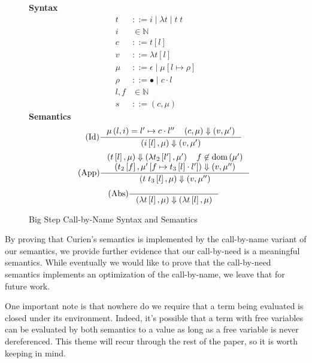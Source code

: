 \begin{figure}
\textbf{Syntax}
\begin{align*}
\tag{Term} t &::= i \; | \; \lambda t \; | \; t \; t  \\
\tag{Variable} i &\in \mathbb{N}  \\
\tag{Closure} c &::= t \left[l\right] \\
\tag{Value} v &::= \lambda t \left[l\right] \\
\tag{Heap} \mu &::= \epsilon \; | \; \mu \left[ l \mapsto \rho \right] \\
\tag{Environment} \rho &::= \bullet \; | \; c \cdot l \\
\tag{Location} l,f &\in \mathbb{N}  \\
\tag{State} s &::= \left(c, \mu \right)
\end{align*}
\textbf{Semantics}
\begin{align*}
\tag{Id} \inference
{\mu \left( l, i \right) = l' \mapsto c \cdot l'' \quad 
 \left(c, \mu\right) \Downarrow \left(v, \mu'\right)}
{\left(i\left[l\right],\mu\right) \Downarrow \left(v, \mu'\right)}
\end{align*}
\begin{align*}
\tag{App} \inference
{\left(t\left[l\right], \mu\right) \Downarrow \left(\lambda t_2\left[l'\right], \mu'\right) 
   \quad f \not \in \textnormal{dom}\left(\mu'\right)
   \\ \left(t_2\left[f\right], \mu'\left[f \mapsto t_3\left[l\right] \cdot l'\right]\right)
         \Downarrow 
      \left(v, \mu'' \right) 
   }
{\left(t \; t_3\left[l\right], \mu\right) \Downarrow \left(v, \mu'' \right)}  
\end{align*}
\begin{align*}
\tag{Abs} \inference {} {\left(\lambda t\left[l\right], \mu\right) \Downarrow \left(\lambda t\left[l\right], \mu\right)}
\end{align*}
\caption{Big Step Call-by-Name \ce Syntax and Semantics}
\label{fig:bigstepname}
\end{figure}

By proving that Curien's semantics is implemented by the call-by-name variant of
our semantics, we provide further evidence that our call-by-need is a
meaningful semantics. While eventually we would like to prove that the
call-by-need semantics implements an optimization of the call-by-name, we leave
that for future work.

One important note is that nowhere do we require that a term being evaluated is
closed under its environment. Indeed, it's possible that a term with free variables
can be evaluated by both semantics to a value as long as a free variable is
never dereferenced. This theme will recur through the rest of the paper, so it
is worth keeping in mind.  
